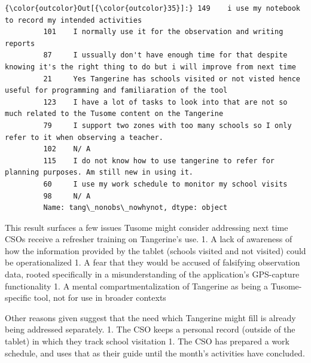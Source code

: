 \documentclass[11pt]{article}
\begin{document}
\begin{Verbatim}[commandchars=\\\{\}]
{\color{outcolor}Out[{\color{outcolor}35}]:} 149    i use my notebook to record my intended activities                                                                     
         101    I normally use it for the observation and writing reports                                                              
         87     I ussually don't have enough time for that despite knowing it's the right thing to do but i will improve from next time
         21     Yes Tangerine has schools visited or not visted hence useful for programming and familiaration of the tool             
         123    I have a lot of tasks to look into that are not so much related to the Tusome content on the Tangerine                 
         79     I support two zones with too many schools so I only refer to it when observing a teacher.                              
         102    N/ A                                                                                                                   
         115    I do not know how to use tangerine to refer for planning purposes. Am still new in using it.                           
         60     I use my work schedule to monitor my school visits                                                                     
         98     N/ A                                                                                                                   
         Name: tang\_nonobs\_nowhynot, dtype: object
\end{Verbatim}
            
    This result surfaces a few issues Tusome might consider addressing next
time CSOs receive a refresher training on Tangerine's use. 1. A lack of
awareness of how the information provided by the tablet (schools visited
and not visited) could be operationalized 1. A fear that they would be
accused of falsifying observation data, rooted specifically in a
misunderstanding of the application's GPS-capture functionality 1. A
mental compartmentalization of Tangerine as being a Tusome-specific
tool, not for use in broader contexts

Other reasons given suggest that the need which Tangerine might fill is
already being addressed separately. 1. The CSO keeps a personal record
(outside of the tablet) in which they track school visitation 1. The CSO
has prepared a work schedule, and uses that as their guide until the
month's activities have concluded.
\end{document}
